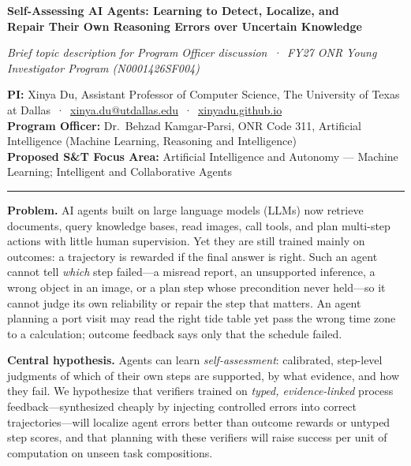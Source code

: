 \documentclass[11pt]{article}
\newcommand{\head}[1]{{\color{navy}\textbf{#1}}\enspace}
\newcommand{\POline}{Dr.\ Behzad Kamgar-Parsi, ONR Code 311, Artificial Intelligence (Machine Learning, Reasoning and Intelligence)}
\newcommand{\FocusArea}{Artificial Intelligence and Autonomy --- Machine Learning; Intelligent and Collaborative Agents}
\begin{document}
\begin{center}
{\fontsize{15.5}{18.5}\selectfont\bfseries\color{navy} Self-Assessing AI Agents: Learning to Detect, Localize, and\\[1pt] Repair Their Own Reasoning Errors over Uncertain Knowledge\par}
\vspace{3pt}
{\small\itshape Brief topic description for Program Officer discussion \,·\, FY27 ONR Young Investigator Program (N0001426SF004)\par}
\end{center}
\vspace{-2pt}
{\small
\textbf{PI:} Xinya Du, Assistant Professor of Computer Science, The University of Texas at Dallas \,·\, \href{mailto:xinya.du@utdallas.edu}{xinya.du@utdallas.edu} \,·\, \href{https://xinyadu.github.io}{xinyadu.github.io}\\
\textbf{Program Officer:} \POline\\
\textbf{Proposed S\&T Focus Area:} \FocusArea\par}
\vspace{-3pt}
{\color{navy}\rule{\linewidth}{0.6pt}}

\head{Problem.} AI agents built on large language models (LLMs) now retrieve documents, query knowledge bases, read images, call tools, and plan multi-step actions with little human supervision. Yet they are still trained mainly on outcomes: a trajectory is rewarded if the final answer is right. Such an agent cannot tell \emph{which} step failed---a misread report, an unsupported inference, a wrong object in an image, or a plan step whose precondition never held---so it cannot judge its own reliability or repair the step that matters. An agent planning a port visit may read the right tide table yet pass the wrong time zone to a calculation; outcome feedback says only that the schedule failed.

\head{Central hypothesis.} Agents can learn \emph{self-assessment}: calibrated, step-level judgments of which of their own steps are supported, by what evidence, and how they fail. We hypothesize that verifiers trained on \emph{typed, evidence-linked} process feedback---synthesized cheaply by injecting controlled errors into correct trajectories---will localize agent errors better than outcome rewards or untyped step scores, and that planning with these verifiers will raise success per unit of computation on unseen task compositions.
\end{document}
